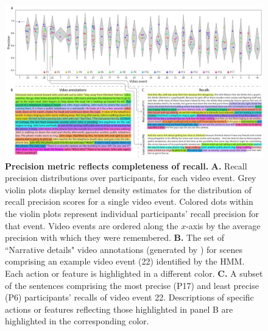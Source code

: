 \documentclass{article}
\begin{document}
\begin{figure}[tp]
  \centering
  \includegraphics[width=1\textwidth]{figs/precision_detail}
  \caption{\small \textbf{Precision metric reflects completeness of recall.} \textbf{A.} Recall precision distributions over participants, for each video event.  Grey violin plots display kernel density estimates for the distribution of recall precision scores for a single video event.  Colored dots within the violin plots represent individual participants' recall precision for that event.  Video events are ordered along the $x$-axis by the average precision with which they were remembered.  \textbf{B.} The set of ``Narrative details" video annotations (generated by \citealp{ChenEtal17}) for scenes comprising an example video event (22) identified by the HMM.  Each action or feature is highlighted in a different color.  \textbf{C.} A subset of the sentences comprising the most precise (P17) and least precise (P6) participants' recalls of video event 22.  Descriptions of specific actions or features reflecting those highlighted in panel B are highlighted in the corresponding color.}
  \label{fig:precision-detail}
\end{figure}
\end{document}

